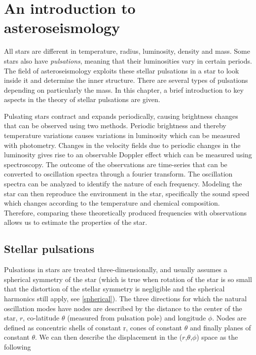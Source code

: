 \chapter{An introduction to asteroseismology}
\label{chap:asteroseismology}

All stars are different in temperature, radius, luminosity, density and mass. Some stars also have \textit{pulsations}, meaning that their luminosities vary in certain periods. The field of asteroseismology exploits these stellar pulsations in a star to look inside it and determine the inner structure. There are several types of pulsations depending on particularly the mass. In this chapter, a brief introduction to key aspects in the theory of stellar pulsations are given.
 
Pulsating stars contract and expands periodically, causing brightness changes that can be observed using two methods. Periodic brightness and thereby temperature variations causes variations in luminosity which can be measured with photometry. Changes in the velocity fields due to periodic changes in the luminosity gives rise to an observable Doppler effect which can be measured using spectroscopy. The outcome of the observations are time-series that can be converted to oscillation spectra through a fourier transform. The oscillation spectra can be analyzed to identify the nature of each frequency. Modeling the star can then reproduce the environment in the star, specifically the sound speed which changes according to the temperature and chemical composition. Therefore, comparing these theoretically produced frequencies with observations allows us to estimate the properties of the star.  

\section{Stellar pulsations}

Pulsations in stars are treated three-dimensionally, and usually assumes a spherical symmetry of the star (which is true when rotation of the star is so small that the distortion of the stellar symmetry is negligible and the spherical harmonics still apply, see \eqref{spherical}). The three directions for which the natural oscillation modes have nodes are described by the distance to the center of the star, $r$, co-latitude $\theta$ (measured from pulsation pole) and longitude $\phi$. Nodes are defined as concentric shells of constant r, cones of constant $\theta$ and finally planes of constant $\theta$. We can then describe the displacement in the ($r$,$\theta$,$\phi$) space as the following

